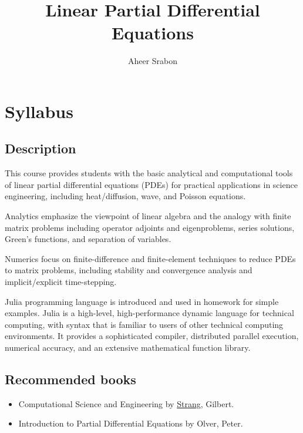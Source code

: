 \documentclass{article}
\title{Linear Partial Differential Equations}
\author{Aheer Srabon}
\theoremstyle{mytheoremstyle}
\theoremstyle{mytheoremstyle}
\theoremstyle{myproblemstyle}
\begin{document}
    \maketitle

    \section{Syllabus}
    \subsection{Description}
    \noindent This course provides students with the basic analytical and computational tools 
    of linear partial differential equations (PDEs) for practical applications in science 
    engineering, including heat/diffusion, wave, and Poisson equations.

    \noindent Analytics emphasize the viewpoint of linear algebra and the analogy with finite matrix
    problems including operator adjoints and eigenproblems, series solutions, Green’s functions,
    and separation of variables.

    \noindent Numerics focus on finite-difference and finite-element techniques to reduce PDEs to matrix
    problems, including stability and convergence analysis and implicit/explicit time-stepping.

    \noindent Julia programming language is introduced and used in homework for simple examples.
    Julia is a high-level, high-performance dynamic language for technical computing,
    with syntax that is familiar to users of other technical computing environments.
    It provides a sophisticated compiler, distributed parallel execution, numerical accuracy,
    and an extensive mathematical function library.

    \subsection{Recommended books}
    \begin{itemize}
    	\item Computational Science and Engineering by 
		\href{https://math.mit.edu/~gs/cse/}{Strang}, Gilbert.
	\item Introduction to Partial Differential Equations by Olver, Peter.
    \end{itemize}
\end{document}
